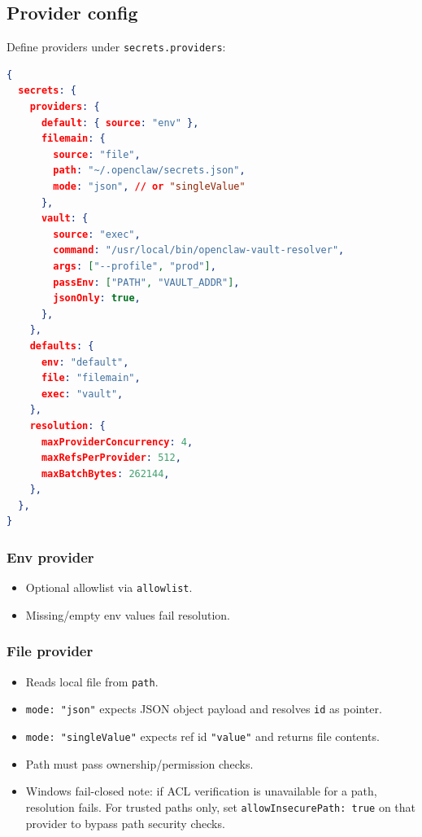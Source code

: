 \subsection{Provider config}


Define providers under \texttt{secrets.providers}:

\begin{lstlisting}[language=json]
{
  secrets: {
    providers: {
      default: { source: "env" },
      filemain: {
        source: "file",
        path: "~/.openclaw/secrets.json",
        mode: "json", // or "singleValue"
      },
      vault: {
        source: "exec",
        command: "/usr/local/bin/openclaw-vault-resolver",
        args: ["--profile", "prod"],
        passEnv: ["PATH", "VAULT_ADDR"],
        jsonOnly: true,
      },
    },
    defaults: {
      env: "default",
      file: "filemain",
      exec: "vault",
    },
    resolution: {
      maxProviderConcurrency: 4,
      maxRefsPerProvider: 512,
      maxBatchBytes: 262144,
    },
  },
}
\end{lstlisting}


\subsubsection{Env provider}


\begin{itemize}
  \item Optional allowlist via \texttt{allowlist}.
  \item Missing/empty env values fail resolution.
\end{itemize}


\subsubsection{File provider}


\begin{itemize}
  \item Reads local file from \texttt{path}.
  \item \texttt{mode: "json"} expects JSON object payload and resolves \texttt{id} as pointer.
  \item \texttt{mode: "singleValue"} expects ref id \texttt{"value"} and returns file contents.
  \item Path must pass ownership/permission checks.
  \item Windows fail-closed note: if ACL verification is unavailable for a path, resolution fails. For trusted paths only, set \texttt{allowInsecurePath: true} on that provider to bypass path security checks.
\end{itemize}


